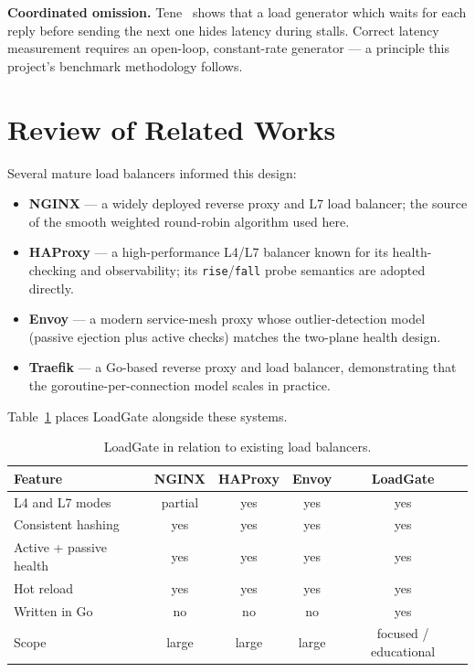 \documentclass[11pt,a4paper]{report}
\newcommand{\code}[1]{\texttt{#1}}
\begin{document}
\textbf{Coordinated omission.} Tene~\cite{tene} shows that a load generator which waits for
each reply before sending the next one hides latency during stalls. Correct latency
measurement requires an open-loop, constant-rate generator --- a principle this project's
benchmark methodology follows.

\section{Review of Related Works}
Several mature load balancers informed this design:
\begin{itemize}
  \item \textbf{NGINX} --- a widely deployed reverse proxy and L7 load balancer; the source of
  the smooth weighted round-robin algorithm used here.
  \item \textbf{HAProxy} --- a high-performance L4/L7 balancer known for its health-checking and
  observability; its \code{rise}/\code{fall} probe semantics are adopted directly.
  \item \textbf{Envoy} --- a modern service-mesh proxy whose outlier-detection model
  (passive ejection plus active checks) matches the two-plane health design.
  \item \textbf{Traefik} --- a Go-based reverse proxy and load balancer, demonstrating that the
  goroutine-per-connection model scales in practice.
\end{itemize}
Table~\ref{tab:related} places LoadGate alongside these systems.

\begin{table}[htbp]
\centering
\caption{LoadGate in relation to existing load balancers.}
\label{tab:related}
\begin{tabular}{p{3.5cm}cccc}
\toprule
\textbf{Feature} & \textbf{NGINX} & \textbf{HAProxy} & \textbf{Envoy} & \textbf{LoadGate}\\
\midrule
L4 and L7 modes        & partial & yes & yes & yes\\
Consistent hashing     & yes & yes & yes & yes\\
Active + passive health& yes & yes & yes & yes\\
Hot reload             & yes & yes & yes & yes\\
Written in Go          & no  & no  & no  & yes\\
Scope                  & large & large & large & focused / educational\\
\bottomrule
\end{tabular}
\end{table}
\end{document}
